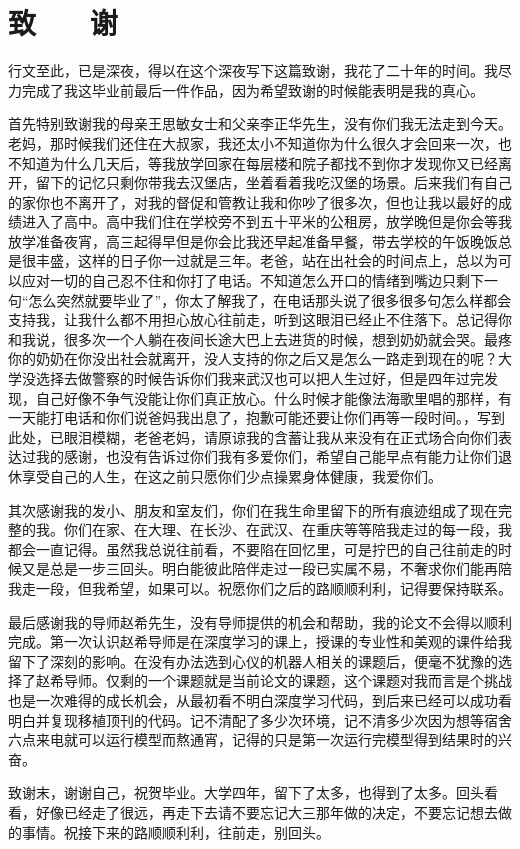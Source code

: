 \section*{致 ~~ 谢}

 行文至此，已是深夜，得以在这个深夜写下这篇致谢，我花了二十年的时间。我尽力完成了我这毕业前最后一件作品，因为希望致谢的时候能表明是我的真心。

 首先特别致谢我的母亲王思敏女士和父亲李正华先生，没有你们我无法走到今天。老妈，那时候我们还住在大叔家，我还太小不知道你为什么很久才会回来一次，也不知道为什么几天后，等我放学回家在每层楼和院子都找不到你才发现你又已经离开，留下的记忆只剩你带我去汉堡店，坐着看着我吃汉堡的场景。后来我们有自己的家你也不离开了，对我的督促和管教让我和你吵了很多次，但也让我以最好的成绩进入了高中。高中我们住在学校旁不到五十平米的公租房，放学晚但是你会等我放学准备夜宵，高三起得早但是你会比我还早起准备早餐，带去学校的午饭晚饭总是很丰盛，这样的日子你一过就是三年。老爸，站在出社会的时间点上，总以为可以应对一切的自己忍不住和你打了电话。不知道怎么开口的情绪到嘴边只剩下一句“怎么突然就要毕业了”，你太了解我了，在电话那头说了很多很多句怎么样都会支持我，让我什么都不用担心放心往前走，听到这眼泪已经止不住落下。总记得你和我说，很多次一个人躺在夜间长途大巴上去进货的时候，想到奶奶就会哭。最疼你的奶奶在你没出社会就离开，没人支持的你之后又是怎么一路走到现在的呢？大学没选择去做警察的时候告诉你们我来武汉也可以把人生过好，但是四年过完发现，自己好像不争气没能让你们真正放心。什么时候才能像法海歌里唱的那样，有一天能打电话和你们说爸妈我出息了，抱歉可能还要让你们再等一段时间。，写到此处，已眼泪模糊，老爸老妈，请原谅我的含蓄让我从来没有在正式场合向你们表达过我的感谢，也没有告诉过你们我有多爱你们，希望自己能早点有能力让你们退休享受自己的人生，在这之前只愿你们少点操累身体健康，我爱你们。

 其次感谢我的发小、朋友和室友们，你们在我生命里留下的所有痕迹组成了现在完整的我。你们在家、在大理、在长沙、在武汉、在重庆等等陪我走过的每一段，我都会一直记得。虽然我总说往前看，不要陷在回忆里，可是拧巴的自己往前走的时候又是总是一步三回头。明白能彼此陪伴走过一段已实属不易，不奢求你们能再陪我走一段，但我希望，如果可以。祝愿你们之后的路顺顺利利，记得要保持联系。

 最后感谢我的导师赵希先生，没有导师提供的机会和帮助，我的论文不会得以顺利完成。第一次认识赵希导师是在深度学习的课上，授课的专业性和美观的课件给我留下了深刻的影响。在没有办法选到心仪的机器人相关的课题后，便毫不犹豫的选择了赵希导师。仅剩的一个课题就是当前论文的课题，这个课题对我而言是个挑战也是一次难得的成长机会，从最初看不明白深度学习代码，到后来已经可以成功看明白并复现移植顶刊的代码。记不清配了多少次环境，记不清多少次因为想等宿舍六点来电就可以运行模型而熬通宵，记得的只是第一次运行完模型得到结果时的兴奋。

 致谢末，谢谢自己，祝贺毕业。大学四年，留下了太多，也得到了太多。回头看看，好像已经走了很远，再走下去请不要忘记大三那年做的决定，不要忘记想去做的事情。祝接下来的路顺顺利利，往前走，别回头。


